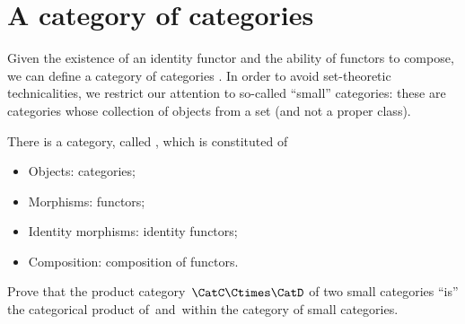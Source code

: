 \section{A category of categories}

Given the existence of an identity functor and the ability of functors to compose, we can define a category of categories \Category.
In order to avoid set-theoretic technicalities, we restrict our attention to so-called ``small'' categories: these are categories whose collection of objects from a set (and not a proper class).

\begin{ctdefinition}
    \label{def:Category}
    There is a category, called \Category, which is constituted of
    \begin{itemize}
        \item Objects: categories;
        \item Morphisms: functors;
        \item Identity morphisms: identity functors;
        \item Composition: composition of functors.
    \end{itemize}
\end{ctdefinition}
\vfill
\begin{gradedexercise}
    Prove that the product category~$\CatC \Ctimes \CatD$ of two small categories ``is'' the categorical product of~\CatC and~\CatD within the category of small categories.
\end{gradedexercise}
